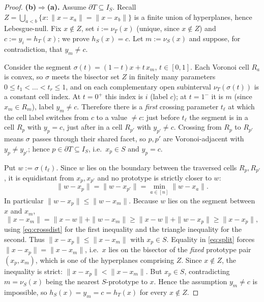 \documentclass{amsart}
\theoremstyle{definition}
\begin{document}
\begin{proof}
\textbf{(b)$\Rightarrow$(a).} Assume $\partial T\subseteq I_S$. Recall
$Z=\bigcup_{a<b}\{x:\|x-x_a\|=\|x-x_b\|\}$ is a finite union of hyperplanes,
hence Lebesgue-null. Fix $x\notin Z$, set $i:=\nu_T(x)$ (unique, since
$x\notin Z$) and $c:=y_i=h_T(x)$; we prove $h_S(x)=c$. Let $m:=\nu_S(x)$ and suppose, for contradiction, that
$y_m\ne c$.

Consider the segment $\sigma(t)=(1-t)x+t\,x_m$, $t\in[0,1]$. Each Voronoi cell
$R_a$ is convex, so $\sigma$ meets the bisector set $Z$ in finitely many
parameters $0\le t_1<\dots<t_r\le1$, and on each complementary open subinterval
$\nu_T(\sigma(t))$ is a constant cell index. At $t=0^+$ this index is $i$
(label $c$); at $t=1^-$ it is $m$ (since $x_m\in R_m$), label $y_m\ne c$.
Therefore there is a \emph{first} crossing parameter $t_\ell$ at which the cell
label switches from $c$ to a value $\ne c$: just before $t_\ell$ the segment is
in a cell $R_p$ with $y_p=c$, just after in a cell $R_{p'}$ with $y_{p'}\ne c$.
Crossing from $R_p$ to $R_{p'}$ means $\sigma$ passes through their shared facet,
so $p,p'$ are Voronoi-adjacent with $y_p\ne y_{p'}$; hence
$p\in\partial T\subseteq I_S$, i.e.\ $x_p\in S$ and $y_p=c$.

Put $w:=\sigma(t_\ell)$. Since $w$ lies on the boundary between the traversed
cells $R_p,R_{p'}$, it is equidistant from $x_p,x_{p'}$ and no prototype is
strictly closer to $w$:
\begin{equation}\label{eq:crossdist}
\|w-x_p\|=\|w-x_{p'}\|=\min_{a\in[n]}\|w-x_a\| .
\end{equation}
In particular $\|w-x_p\|\le\|w-x_m\|$. Because $w$ lies on the segment between
$x$ and $x_m$,
\begin{equation}\label{eq:split}
\|x-x_m\|=\|x-w\|+\|w-x_m\|\ge\|x-w\|+\|w-x_p\|\ge\|x-x_p\|,
\end{equation}
using \eqref{eq:crossdist} for the first inequality and the triangle inequality
for the second. Thus $\|x-x_p\|\le\|x-x_m\|$ with $x_p\in S$. Equality in
\eqref{eq:split} forces $\|x-x_p\|=\|x-x_m\|$, i.e.\ $x$ lies on the bisector of
the \emph{fixed} prototype pair $(x_p,x_m)$, which is one of the hyperplanes
comprising $Z$. Since $x\notin Z$, the inequality is strict:
$\|x-x_p\|<\|x-x_m\|$. But $x_p\in S$, contradicting $m=\nu_S(x)$ being the
nearest $S$-prototype to $x$. Hence the assumption $y_m\ne c$ is impossible, so
$h_S(x)=y_m=c=h_T(x)$ for every $x\notin Z$.


\end{proof}
\end{document}

